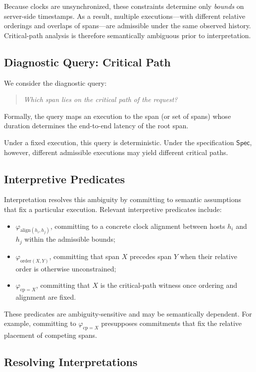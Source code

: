 \documentclass[acmsmall,nonacm]{acmart}
\theoremstyle{remark}
\numberwithin{definition}{section}
\numberwithin{theorem}{section}
\numberwithin{lemma}{section}
\numberwithin{corollary}{section}
\numberwithin{remark}{section}
\numberwithin{example}{section}
\numberwithin{observation}{section}
\numberwithin{assumption}{section}
\newcommand{\Spec}{\mathsf{Spec}}
\begin{document}
Because clocks are unsynchronized, these constraints determine only \emph{bounds}
on server-side timestamps.
As a result, multiple executions---with different relative orderings and overlaps
of spans---are admissible under the same observed history.
Critical-path analysis is therefore semantically ambiguous prior to interpretation.

\subsection{Diagnostic Query: Critical Path}

We consider the diagnostic query:
\begin{quote}
\emph{Which span lies on the critical path of the request?}
\end{quote}
Formally, the query maps an execution to the span (or set of spans) whose duration
determines the end-to-end latency of the root span.

Under a fixed execution, this query is deterministic.
Under the specification $\Spec$, however, different admissible executions may
yield different critical paths.

\subsection{Interpretive Predicates}

Interpretation resolves this ambiguity by committing to semantic assumptions that
fix a particular execution.
Relevant interpretive predicates include:
\begin{itemize}
  \item $\varphi_{\mathrm{align}(h_i,h_j)}$, committing to a concrete clock
        alignment between hosts $h_i$ and $h_j$ within the admissible bounds;
  \item $\varphi_{\mathrm{order}(X,Y)}$, committing that span $X$ precedes span
        $Y$ when their relative order is otherwise unconstrained;
  \item $\varphi_{\mathrm{cp}=X}$, committing that $X$ is the critical-path
        witness once ordering and alignment are fixed.
\end{itemize}

These predicates are ambiguity-sensitive and may be semantically dependent.
For example, committing to $\varphi_{\mathrm{cp}=X}$ presupposes commitments that
fix the relative placement of competing spans.

\subsection{Resolving Interpretations}
\end{document}
